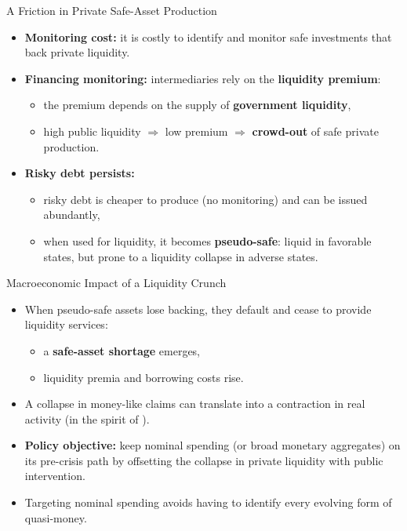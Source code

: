\documentclass[11pt,aspectratio=169]{beamer}
\begin{document}
\begin{frame}{A Friction in Private Safe-Asset Production}
\small
\begin{itemize}
  \item \textbf{Monitoring cost:} it is costly to identify and monitor safe investments that back private liquidity.
  \vspace{0.35em}
  \item \textbf{Financing monitoring:} intermediaries rely on the \textbf{liquidity premium}:
  \begin{itemize}
    \item the premium depends on the supply of \textbf{government liquidity},
    \item high public liquidity $\Rightarrow$ low premium $\Rightarrow$ \textbf{crowd-out} of safe private production.
  \end{itemize}
  \vspace{0.35em}
  \item \textbf{Risky debt persists:}
  \begin{itemize}
    \item risky debt is cheaper to produce (no monitoring) and can be issued abundantly,
    \item when used for liquidity, it becomes \textbf{pseudo-safe}:
    liquid in favorable states, but prone to a liquidity collapse in adverse states.
  \end{itemize}
\end{itemize}
\end{frame}

\begin{frame}{Macroeconomic Impact of a Liquidity Crunch}
\small
\begin{itemize}
  \item When pseudo-safe assets lose backing, they default and cease to provide liquidity services:
  \begin{itemize}
    \item a \textbf{safe-asset shortage} emerges,
    \item liquidity premia and borrowing costs rise.
  \end{itemize}
  \vspace{0.35em}
  \item A collapse in money-like claims can translate into a contraction in real activity
  (in the spirit of \textcite{friedmanschwartz1963}).
  \vspace{0.35em}
  \item \textbf{Policy objective:} keep nominal spending (or broad monetary aggregates) on its pre-crisis path by offsetting the collapse in private liquidity with public intervention.
  \item Targeting nominal spending avoids having to identify every evolving form of quasi-money.
\end{itemize}
\end{frame}
\end{document}
